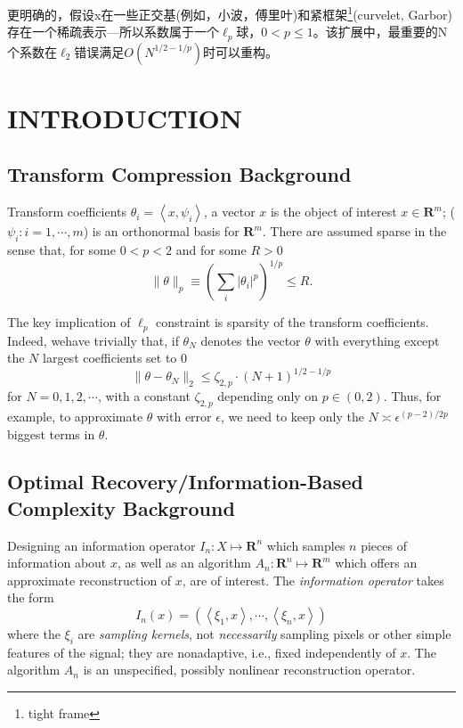     更明确的，假设x在一些正交基(例如，小波，傅里叶)和紧框架\footnote{tight frame}(curvelet, Garbor)存在一个稀疏表示---所以系数属于一个$\ell_p$球，$0<p\leq 1$。该扩展中，最重要的N个系数在$\ell_2$错误满足$O(N^{1/2-1/p})$时可以重构。

\section{INTRODUCTION}
\subsection{Transform Compression Background}
\textcolor[rgb]{1,0,0}{Transform coefficients} $\theta_i = \left<x,\psi_i\right>$, a vector $x$ is the object of interest $x \in \mathbf{R}^m$; ($\psi_i: i=1, \cdots, m$) is an orthonormal basis for $\mathbf{R}^m$. There are assumed sparse in the sense that, for some $0<p<2$ and for some $R>0$
\begin{equation}
    \|\theta\|_p \equiv \left(\sum\limits_i|\theta_i|^p\right)^{1/p} \leq R.
    \label{eq3.1.1}
\end{equation}

The key implication of $\ell_p$ constraint is sparsity of the transform coefficients. Indeed, wehave trivially that, if $\theta_N$ denotes the vector $\theta$ with everything except the $N$ largest coefficients set to $0$
\begin{equation}
    \|\theta - \theta_N \|_2 \leq \zeta_{2,p} \cdot (N+1)^{1/2-1/p}
    \label{eq3.1.2}
\end{equation}
for $N = 0,1,2,\cdots$, with a constant $\zeta_{2,p}$ depending only on $p \in (0,2)$. Thus, for example, to approximate $\theta$ with error $\epsilon$, we need to keep only the $N \asymp \epsilon^{(p-2)/2p}$ biggest terms in $\theta$. 

\subsection{Optimal Recovery/Information-Based Complexity Background}
Designing an information operator $I_n:X \longmapsto \mathbf{R}^n$ which samples $n$ pieces of information about $x$, as well as an algorithm $A_n:\mathbf{R}^n \longmapsto \mathbf{R}^m$ which offers an approximate reconstruction of $x$, are of interest. The \emph{\textcolor[rgb]{1,0,0}{information operator}} takes the form  
\begin{equation*}
    I_n(x) = \left(\left<\xi_1,x\right>,\cdots,\left<\xi_n,x\right>\right)
\end{equation*}
where the $\xi_i$ are \emph{\textcolor[rgb]{1,0,0}{sampling kernels}}, not \emph{\textcolor[rgb]{0,0,1}{necessarily}} sampling pixels or other simple features of the signal; they are nonadaptive, i.e., fixed independently of $x$. The algorithm $A_n$ is an unspecified, possibly nonlinear reconstruction operator. 

